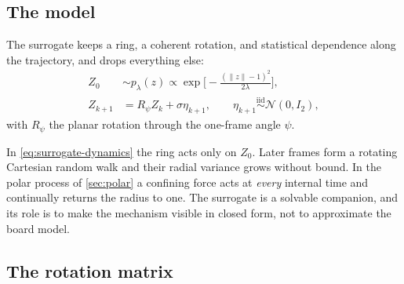 \documentclass[11pt,a4paper]{article}
\newcommand{\N}{\mathcal{N}}
\begin{document}
\subsection{The model}

The surrogate keeps a ring, a coherent rotation, and statistical dependence along the
trajectory, and drops everything else:
\begin{align}
 Z_0&\sim p_\lambda(z)\propto\exp\Big[-\frac{(\|z\|-1)^2}{2\lambda}\Big],
 \label{eq:surrogate-prior}\\
 Z_{k+1}&=R_\psi Z_k+\sigma\eta_{k+1},
 \qquad\eta_{k+1}\overset{\text{iid}}{\sim}\N(0,I_2) ,
 \label{eq:surrogate-dynamics}
\end{align}
with $R_\psi$ the planar rotation through the one-frame angle $\psi$.

\begin{caution}
In \eqref{eq:surrogate-dynamics} the ring acts only on $Z_0$. Later frames form a rotating
Cartesian random walk and their radial variance grows without bound. In the polar process of
\cref{sec:polar} a confining force acts at \emph{every} internal time and continually returns
the radius to one. The surrogate is a solvable companion, and its role is to make the
mechanism visible in closed form, not to approximate the board model.
\end{caution}

\subsection{The rotation matrix}\label{sec:rotation-matrix}
\end{document}
